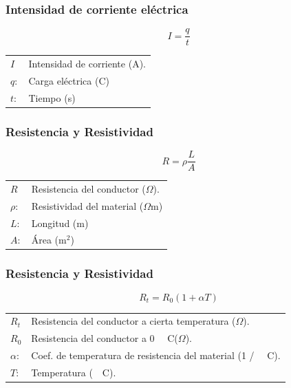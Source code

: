 \documentclass[handout]{beamer}
\newcommand{\celsius}{~\textdegree~C}
\begin{document}
\begin{frame}
  \frametitle{Intensidad de corriente eléctrica}
  
  {\huge \[I =\frac{q}{t}\]}
  
  \begin{tabular}{ll}
    $I$ & Intensidad de corriente (A).  \\ 
    $q:$ & Carga eléctrica (C) \\ 
    $t:$ & Tiempo (s) \\

  \end{tabular}
  
\end{frame}




\begin{frame}
  \frametitle{Resistencia y Resistividad}
  
  {\huge \[R = \rho \frac{L}{A}\]}
  
  \begin{tabular}{ll}
    $R$ & Resistencia del conductor ($\Omega$).  \\ 
    $\rho:$ & Resistividad del material ($\Omega$m) \\ 
    $L:$ & Longitud (m) \\
    $A:$ & Área (m$^2$) \\
  \end{tabular}
  
\end{frame}

\begin{frame}
  \frametitle{Resistencia y Resistividad}
  
  {\huge \[R_t = R_0 (1+\alpha T)\]}
  
  \begin{tabular}{ll}
    $R_t$ & Resistencia del conductor a cierta temperatura ($\Omega$).  \\ 
    $R_0$ & Resistencia del conductor a 0 \celsius ($\Omega$).  \\ 
    $\alpha:$ & Coef. de temperatura de resistencia del material (1 / \celsius). \\ 
    $T:$ & Temperatura (\celsius). \\
  \end{tabular}
  
\end{frame}
\end{document}
